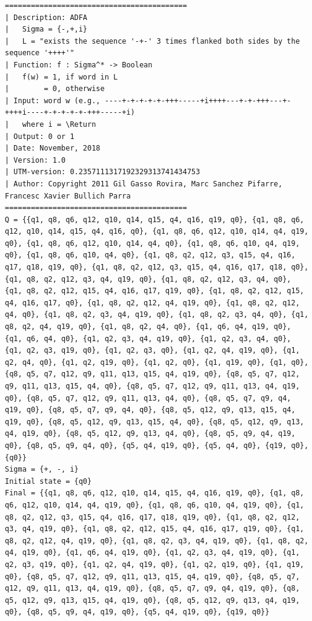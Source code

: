 \documentclass[12pt,a4paper]{report}
\begin{document}
\begin{lstlisting}
==========================================
| Description: ADFA
|   Sigma = {-,+,i}
|   L = "exists the sequence '-+-' 3 times flanked both sides by the sequence '++++'"
| Function: f : Sigma^* -> Boolean
|   f(w) = 1, if word in L
|        = 0, otherwise
| Input: word w (e.g., ----+-+-+-+-+-+++-----+i++++---+-+-+++---+-++++i----+-+-+-+-+-+++-----+i)
|   where i = \Return
| Output: 0 or 1
| Date: November, 2018
| Version: 1.0
| UTM-version: 0.2357111317192329313741434753
| Author: Copyright 2011 Gil Gasso Rovira, Marc Sanchez Pifarre, Francesc Xavier Bullich Parra
==========================================
Q = {{q1, q8, q6, q12, q10, q14, q15, q4, q16, q19, q0}, {q1, q8, q6, q12, q10, q14, q15, q4, q16, q0}, {q1, q8, q6, q12, q10, q14, q4, q19, q0}, {q1, q8, q6, q12, q10, q14, q4, q0}, {q1, q8, q6, q10, q4, q19, q0}, {q1, q8, q6, q10, q4, q0}, {q1, q8, q2, q12, q3, q15, q4, q16, q17, q18, q19, q0}, {q1, q8, q2, q12, q3, q15, q4, q16, q17, q18, q0}, {q1, q8, q2, q12, q3, q4, q19, q0}, {q1, q8, q2, q12, q3, q4, q0}, {q1, q8, q2, q12, q15, q4, q16, q17, q19, q0}, {q1, q8, q2, q12, q15, q4, q16, q17, q0}, {q1, q8, q2, q12, q4, q19, q0}, {q1, q8, q2, q12, q4, q0}, {q1, q8, q2, q3, q4, q19, q0}, {q1, q8, q2, q3, q4, q0}, {q1, q8, q2, q4, q19, q0}, {q1, q8, q2, q4, q0}, {q1, q6, q4, q19, q0}, {q1, q6, q4, q0}, {q1, q2, q3, q4, q19, q0}, {q1, q2, q3, q4, q0}, {q1, q2, q3, q19, q0}, {q1, q2, q3, q0}, {q1, q2, q4, q19, q0}, {q1, q2, q4, q0}, {q1, q2, q19, q0}, {q1, q2, q0}, {q1, q19, q0}, {q1, q0}, {q8, q5, q7, q12, q9, q11, q13, q15, q4, q19, q0}, {q8, q5, q7, q12, q9, q11, q13, q15, q4, q0}, {q8, q5, q7, q12, q9, q11, q13, q4, q19, q0}, {q8, q5, q7, q12, q9, q11, q13, q4, q0}, {q8, q5, q7, q9, q4, q19, q0}, {q8, q5, q7, q9, q4, q0}, {q8, q5, q12, q9, q13, q15, q4, q19, q0}, {q8, q5, q12, q9, q13, q15, q4, q0}, {q8, q5, q12, q9, q13, q4, q19, q0}, {q8, q5, q12, q9, q13, q4, q0}, {q8, q5, q9, q4, q19, q0}, {q8, q5, q9, q4, q0}, {q5, q4, q19, q0}, {q5, q4, q0}, {q19, q0}, {q0}}
Sigma = {+, -, i}
Initial state = {q0}
Final = {{q1, q8, q6, q12, q10, q14, q15, q4, q16, q19, q0}, {q1, q8, q6, q12, q10, q14, q4, q19, q0}, {q1, q8, q6, q10, q4, q19, q0}, {q1, q8, q2, q12, q3, q15, q4, q16, q17, q18, q19, q0}, {q1, q8, q2, q12, q3, q4, q19, q0}, {q1, q8, q2, q12, q15, q4, q16, q17, q19, q0}, {q1, q8, q2, q12, q4, q19, q0}, {q1, q8, q2, q3, q4, q19, q0}, {q1, q8, q2, q4, q19, q0}, {q1, q6, q4, q19, q0}, {q1, q2, q3, q4, q19, q0}, {q1, q2, q3, q19, q0}, {q1, q2, q4, q19, q0}, {q1, q2, q19, q0}, {q1, q19, q0}, {q8, q5, q7, q12, q9, q11, q13, q15, q4, q19, q0}, {q8, q5, q7, q12, q9, q11, q13, q4, q19, q0}, {q8, q5, q7, q9, q4, q19, q0}, {q8, q5, q12, q9, q13, q15, q4, q19, q0}, {q8, q5, q12, q9, q13, q4, q19, q0}, {q8, q5, q9, q4, q19, q0}, {q5, q4, q19, q0}, {q19, q0}}

\end{lstlisting}
\end{document}
